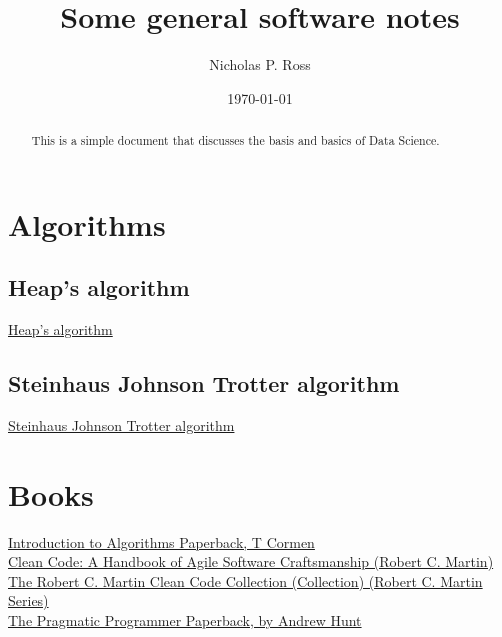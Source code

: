 \documentclass[11pt]{article}
\begin{document}
\title{Some general software notes}
\author{Nicholas P. Ross}
\date{\today}
\maketitle


\begin{abstract}
This is a simple document that discusses the basis and basics of Data Science. 
\end{abstract}


\tableofcontents


\newpage
\section{Algorithms}

\subsection*{Heap's algorithm}
\href{https://en.wikipedia.org/wiki/Heap\%27s_algorithm}{Heap's algorithm}\\


\subsection*{Steinhaus Johnson Trotter algorithm}
\href{https://en.wikipedia.org/wiki/Steinhaus\%E2\%80\%93Johnson\%E2\%80\%93Trotter_algorithm}{Steinhaus Johnson Trotter algorithm}\\



\newpage
\section{Books}
\href{https://www.amazon.co.uk/Introduction-Algorithms-T-Cormen/dp/0262533057}{Introduction to Algorithms Paperback, T Cormen}\\
\href{https://www.amazon.co.uk/Clean-Code-Handbook-Software-Craftsmanship/dp/0132350882/}{Clean Code: A Handbook of Agile Software Craftsmanship (Robert C. Martin)}\\
\href{https://www.amazon.co.uk/Robert-Martin-Clean-Code-Collection-ebook/dp/B00666M59G}{The Robert C. Martin Clean Code Collection (Collection) (Robert C. Martin Series)}\\
\href{https://www.amazon.co.uk/Pragmatic-Programmer-Andrew-Hunt/dp/020161622X}{The Pragmatic Programmer Paperback, by Andrew Hunt}\\
\end{document}
